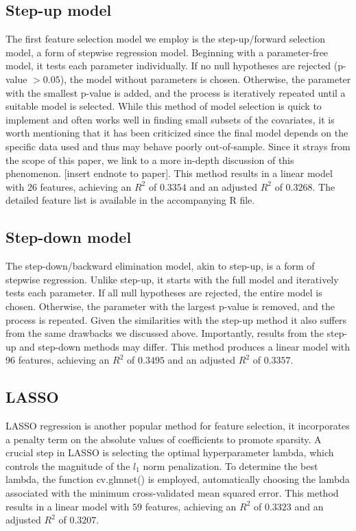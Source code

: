 \documentclass[12pt]{article}
\begin{document}
\subsection{Step-up model}
The first feature selection model we employ is the step-up/forward selection model, a form of stepwise regression model. Beginning with a parameter-free model, it tests each parameter individually. If no null hypotheses are rejected (p-value $> 0.05$), the model without parameters is chosen. Otherwise, the parameter with the smallest p-value is added, and the process is iteratively repeated until a suitable model is selected. While this method of model selection is quick to implement and often works well in finding small subsets of the covariates, it is worth mentioning that it has been criticized since the final model depends on the specific data used and thus may behave poorly out-of-sample. Since it strays from the scope of this paper, we link to a more in-depth discussion of this phenomenon. [insert endnote to paper].
This method results in a linear model with $26$ features, achieving an $R^2$ of $0.3354$ and an adjusted $R^2$ of $0.3268$. The detailed feature list is available in the accompanying R file.

\subsection{Step-down model}
The step-down/backward elimination model, akin to step-up, is a form of stepwise regression. Unlike step-up, it starts with the full model and iteratively tests each parameter. If all null hypotheses are rejected, the entire model is chosen. Otherwise, the parameter with the largest p-value is removed, and the process is repeated. Given the similarities with the step-up method it also suffers from the same drawbacks we discussed above. Importantly, results from the step-up and step-down methods may differ.
This method produces a linear model with 96 features, achieving an $R^2$ of $0.3495$ and an adjusted $R^2$ of $0.3357$.

\subsection{LASSO}
LASSO regression is another popular method for feature selection, it incorporates a penalty term on the absolute values of coefficients to promote sparsity. A crucial step in LASSO is selecting the optimal hyperparameter lambda, which controls the magnitude of the $l_1$ norm penalization. To determine the best lambda, the function cv.glmnet() is employed, automatically choosing the lambda associated with the minimum cross-validated mean squared error.
This method results in a linear model with $59$ features, achieving an $R^2$ of $0.3323$ and an adjusted $R^2$ of $0.3207$.
\end{document}
